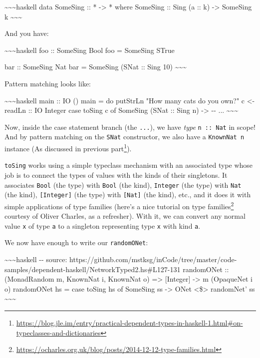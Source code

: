 \documentclass[]{article}
\renewcommand{\href}[2]{#2\footnote{\url{#1}}}
\begin{document}
\textasciitilde{}\textasciitilde{}\textasciitilde{}haskell data SomeSing :: *
-\textgreater{} * where SomeSing :: Sing (a :: k) -\textgreater{} SomeSing k
\textasciitilde{}\textasciitilde{}\textasciitilde{}

And you have:

\textasciitilde{}\textasciitilde{}\textasciitilde{}haskell foo :: SomeSing Bool
foo = SomeSing STrue

bar :: SomeSing Nat bar = SomeSing (SNat :: Sing 10)
\textasciitilde{}\textasciitilde{}\textasciitilde{}

Pattern matching looks like:

\textasciitilde{}\textasciitilde{}\textasciitilde{}haskell main :: IO () main =
do putStrLn "How many cats do you own?" c \textless{}- readLn :: IO Integer case
toSing c of SomeSing (SNat :: Sing n) -\textgreater{} -\/- ...
\textasciitilde{}\textasciitilde{}\textasciitilde{}

Now, inside the case statement branch (the \texttt{...}), we have \emph{type}
\texttt{n\ ::\ Nat} in scope! And by pattern matching on the \texttt{SNat}
constructor, we also have a \texttt{KnownNat\ n} instance (As discussed in
\href{https://blog.jle.im/entry/practical-dependent-types-in-haskell-1.html\#on-typeclasses-and-dictionaries}{previous
part}).

\texttt{toSing} works using a simple typeclass mechanism with an associated type
whose job is to connect the types of values with the kinds of their singletons.
It associates \texttt{Bool} (the type) with \texttt{Bool} (the kind),
\texttt{Integer} (the type) with \texttt{Nat} (the kind), \texttt{{[}Integer{]}}
(the type) with \texttt{{[}Nat{]}} (the kind), etc., and it does it with simple
applications of type families (here's a
\href{https://ocharles.org.uk/blog/posts/2014-12-12-type-families.html}{nice
tutorial on type families} courtesy of Oliver Charles, as a refresher). With it,
we can convert any normal value \texttt{x} of type \texttt{a} to a singleton
representing type \texttt{x} with kind \texttt{a}.

We now have enough to write our \texttt{randomONet}:

\textasciitilde{}\textasciitilde{}\textasciitilde{}haskell -\/- source:
https://github.com/mstksg/inCode/tree/master/code-samples/dependent-haskell/NetworkTyped2.hs\#L127-131
randomONet :: (MonadRandom m, KnownNat i, KnownNat o) =\textgreater{}
{[}Integer{]} -\textgreater{} m (OpaqueNet i o) randomONet hs = case toSing hs
of SomeSing ss -\textgreater{} ONet \textless{}\$\textgreater{} randomNet' ss
\textasciitilde{}\textasciitilde{}\textasciitilde{}
\end{document}
